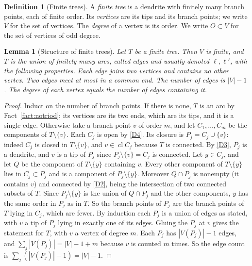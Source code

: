 \documentclass[11pt]{amsart}
\newtheorem{lemma}[theorem]{Lemma}
\theoremstyle{definition}
\newtheorem{definition}[theorem]{Definition}
\theoremstyle{remark}
\newcommand{\Odd}{O}
\newcommand{\Ver}{V}
\newcommand{\cl}{\operatorname{cl}}
\begin{document}
\begin{definition}[Finite trees]\label{def:tree}
A \emph{finite tree} is a dendrite with finitely many branch points, each of finite order. Its \emph{vertices} are its tips and its branch points; we write $\Ver$ for the set of vertices. The \emph{degree} of a vertex is its order. We write $\Odd\subset\Ver$ for the set of vertices of odd degree.
\end{definition}

\begin{lemma}[Structure of finite trees]\label{lem:treestructure}
Let $T$ be a finite tree. Then $\Ver$ is finite, and $T$ is the union of finitely many arcs, called \emph{edges} and usually denoted $\ell,\ell'$, with the following properties. Each edge joins two vertices and contains no other vertex. Two edges meet at most in a common end. The number of edges is $|\Ver|-1$. The degree of each vertex equals the number of edges containing it.
\end{lemma}
\begin{proof}
Induct on the number of branch points. If there is none, $T$ is an arc by Fact~\ref{fact:notriod}; its vertices are its two ends, which are its tips, and it is a single edge. Otherwise take a branch point $v$ of order $m$, and let $C_1,\dots,C_m$ be the components of $T\setminus\{v\}$. Each $C_j$ is open by \ref{D4}. Its closure is $P_j=C_j\cup\{v\}$: indeed $C_j$ is closed in $T\setminus\{v\}$, and $v\in\cl C_j$ because $T$ is connected. By \ref{D3}, $P_j$ is a dendrite, and $v$ is a tip of $P_j$ since $P_j\setminus\{v\}=C_j$ is connected. Let $y\in C_j$, and let $Q$ be the component of $T\setminus\{y\}$ containing $v$. Every other component of $T\setminus\{y\}$ lies in $C_j\subset P_j$ and is a component of $P_j\setminus\{y\}$. Moreover $Q\cap P_j$ is nonempty (it contains $v$) and connected by \ref{D2}, being the intersection of two connected subsets of $T$. Since $P_j\setminus\{y\}$ is the union of $Q\cap P_j$ and the other components, $y$ has the same order in $P_j$ as in $T$. So the branch points of $P_j$ are the branch points of $T$ lying in $C_j$, which are fewer. By induction each $P_j$ is a union of edges as stated, with $v$ a tip of $P_j$ lying in exactly one of its edges. Gluing the $P_j$ at $v$ gives the statement for $T$, with $v$ a vertex of degree $m$. Each $P_j$ has $|\Ver(P_j)|-1$ edges, and $\sum_j|\Ver(P_j)|=|\Ver|-1+m$ because $v$ is counted $m$ times. So the edge count is $\sum_j(|\Ver(P_j)|-1)=|\Ver|-1$.
\end{proof}
\end{document}
